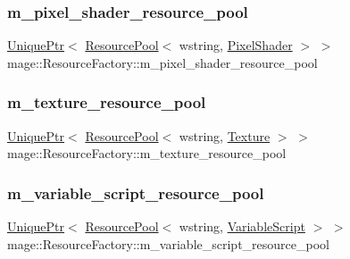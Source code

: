 \subsubsection{\texorpdfstring{m\+\_\+pixel\+\_\+shader\+\_\+resource\+\_\+pool}{m\_pixel\_shader\_resource\_pool}}
{\footnotesize\ttfamily \hyperlink{namespacemage_a8c307fbcc33bce9b7f2aa4c26c3b95cf}{Unique\+Ptr}$<$ \hyperlink{classmage_1_1_resource_pool}{Resource\+Pool}$<$ wstring, \hyperlink{classmage_1_1_pixel_shader}{Pixel\+Shader} $>$ $>$ mage\+::\+Resource\+Factory\+::m\+\_\+pixel\+\_\+shader\+\_\+resource\+\_\+pool\hspace{0.3cm}{\ttfamily [private]}}

\hypertarget{classmage_1_1_resource_factory_a0bb6251c64ac1f5e9de04968f9d78e57}{}\label{classmage_1_1_resource_factory_a0bb6251c64ac1f5e9de04968f9d78e57} 
\subsubsection{\texorpdfstring{m\+\_\+texture\+\_\+resource\+\_\+pool}{m\_texture\_resource\_pool}}
{\footnotesize\ttfamily \hyperlink{namespacemage_a8c307fbcc33bce9b7f2aa4c26c3b95cf}{Unique\+Ptr}$<$ \hyperlink{classmage_1_1_resource_pool}{Resource\+Pool}$<$ wstring, \hyperlink{classmage_1_1_texture}{Texture} $>$ $>$ mage\+::\+Resource\+Factory\+::m\+\_\+texture\+\_\+resource\+\_\+pool\hspace{0.3cm}{\ttfamily [private]}}

\hypertarget{classmage_1_1_resource_factory_a78b0848a3aa92c338d2bc209996dd649}{}\label{classmage_1_1_resource_factory_a78b0848a3aa92c338d2bc209996dd649} 
\subsubsection{\texorpdfstring{m\+\_\+variable\+\_\+script\+\_\+resource\+\_\+pool}{m\_variable\_script\_resource\_pool}}
{\footnotesize\ttfamily \hyperlink{namespacemage_a8c307fbcc33bce9b7f2aa4c26c3b95cf}{Unique\+Ptr}$<$ \hyperlink{classmage_1_1_resource_pool}{Resource\+Pool}$<$ wstring, \hyperlink{classmage_1_1_variable_script}{Variable\+Script} $>$ $>$ mage\+::\+Resource\+Factory\+::m\+\_\+variable\+\_\+script\+\_\+resource\+\_\+pool\hspace{0.3cm}{\ttfamily [private]}}

